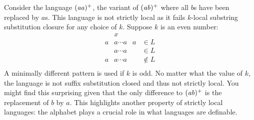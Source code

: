 %
\begin{examplebox}
    Consider the language $(\mathit{aa})^+$, the variant of $(\mathit{ab})^+$ where all $b$s have been replaced by $a$s.
    This language is not strictly local as it fails $k$-local substring substitution closure for any choice of $k$.
    Suppose $k$ is an even number:
    \[
        \begin{array}{rcll}
            & x & & \\
        a & a \cdots a & a & \in L \\
          & a \cdots a &   & \in L \\\hline
        a & a \cdots a &   & \notin L\\
        \end{array}
    \]
    A minimally different pattern is used if $k$ is odd.
    No matter what the value of $k$, the language is not suffix substitution closed and thus not strictly local.
    You might find this surprising given that the only difference to $(\mathit{ab})^+$ is the replacement of $b$ by $a$.
    This highlights another property of strictly local languages: the alphabet plays a crucial role in what languages are definable.
\end{examplebox}
%
